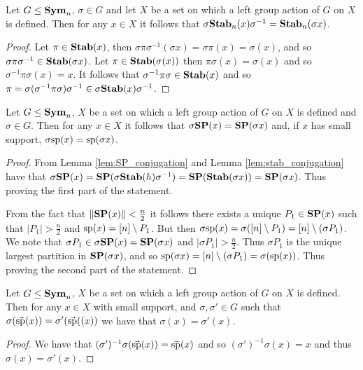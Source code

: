 \documentclass[../paper.tex]{subfiles}
\begin{document}
\begin{lem}
  \label{lem:stab_conjugation}
  Let $G \leq \text{\textbf{Sym}}_n$, $\sigma \in G$ and let $X$ be a set on which a left group
  action of $G$ on $X$ is defined. Then for any $x \in X$ it follows that
  $\sigma \text{\textbf{Stab}}_n (x) \sigma^{-1} = \text{\textbf{Stab}}_n(\sigma x)$.
\end{lem}

\begin{proof}
  Let $\pi \in \text{\textbf{Stab}}(x)$, then $\sigma \pi \sigma^{-1}(\sigma x) = \sigma \pi
  (x) = \sigma (x)$, and so $\sigma \pi \sigma^{-1} \in \text{\textbf{Stab}}(\sigma x)$. Let
  $\pi \in \text{\textbf{Stab}}(\sigma (x))$ then $\pi \sigma (x) = \sigma (x)$ and so
  $\sigma^{-1} \pi \sigma (x) = x$. It follows that $\sigma^{-1} \pi \sigma \in
  \text{\textbf{Stab}}(x)$ and so $\pi = \sigma (\sigma^{-1} \pi \sigma) \sigma ^{-1} \in
  \sigma \text{\textbf{Stab}}(x) \sigma^{-1}$.
\end{proof}

\begin{lem}
  \label{lem:support-mapping}
  Let $G \leq \text{\textbf{Sym}}_n$, $X$ be a set on which a left group action of $G$ on $X$
  is defined and $\sigma \in G$. Then for any $x \in X$ it follows that $\sigma
  \text{\textbf{SP}} (x) = \text{\textbf{SP}} (\sigma x)$ and, if $x$ has small support, $\sigma \text{sp} (x) =
  \text{sp} (\sigma x)$.
\end{lem}
\begin{proof}
  From Lemma \ref{lem:SP_conjugation} and Lemma \ref{lem:stab_conjugation} have
  that $\sigma \text{\textbf{SP}} (x) = \text{\textbf{SP}}(\sigma \text{\textbf{Stab}}(h) \sigma^{-1}) = \text{\textbf{SP}} (\text{\textbf{Stab}}(\sigma
  x)) = \text{\textbf{SP}} (\sigma x)$. Thus proving the first part of the statement.

  From the fact that $\| \text{\textbf{SP}}(x) \| < \frac{n}{2}$ it follows there exists a
  unique $P_1 \in \text{\textbf{SP}}(x)$ such that $\vert P_1 \vert > \frac{n}{2}$ and
  $\text{sp}(x) = [n] \setminus P_1$. But then $\sigma \text{sp} (x) = \sigma([n]
  \setminus P_1) = [n] \setminus (\sigma P_1)$. We note that $\sigma P_1 \in
  \sigma \text{\textbf{SP}} (x) = \text{\textbf{SP}}(\sigma x)$ and $\vert \sigma P_1 \vert > \frac{n}{2}$.
  Thus $\sigma P_1$ is the unique largest partition in $\text{\textbf{SP}}(\sigma x)$, and so
  $\text{sp}(\sigma x) = [n]\setminus (\sigma P_1) = \sigma (\text{sp}(x))$. Thus
  proving the second part of the statement.
\end{proof}

\begin{lem}
  Let $G \leq \text{\textbf{Sym}}_n$, $X$ be a set on which a left group action of $G$ on $X$
  is defined. Then for any $x \in X$ with small support, and $\sigma, \sigma'
  \in G$ such that $\sigma (\vec{\text{sp}}(x)) = \sigma' (\vec{\text{sp}}((x))$ we
  have that $\sigma (x) = \sigma'(x)$.
  \label{lem:support-determine-action}
\end{lem}
\begin{proof}
  We have that $(\sigma')^{-1}\sigma(\vec{\text{sp}}(x)) = \vec{\text{sp}}(x)$ and so
  $(\sigma')^{-1} \sigma (x) = x$ and thus $\sigma (x) = \sigma' (x)$.
\end{proof}
\end{document}
